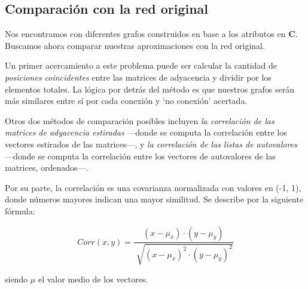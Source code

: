 
\vspace{2em}
\subsection{Comparación con la red original}


Nos encontramos con diferentes grafos construidos en base a los atributos en \textbf{C}. Buscamos ahora comparar nuestras aproximaciones con la red original. 

\vspace{1em}
Un primer acercamiento a este problema puede ser calcular la cantidad de \textit{posiciones coincidentes} entre las matrices de adyacencia y dividir por los elementos totales. La lógica por detrás del método es que nuestros grafos serán más similares entre sí por cada conexión y `no conexión' acertada. %

Otros dos métodos de comparación posibles incluyen \textit{la correlación de las matrices de adyacencia estiradas} ---donde se computa la correlación entre los vectores estirados de las matrices---, y \textit{la correlación de las listas de autovalores} ---donde se computa la correlación entre los vectores de autovalores de las matrices, ordenados---. 

Por su parte, la correlación es una covarianza normalizada con valores en (-1, 1), donde números mayores indican una mayor similitud. Se describe por la siguiente fórmula:

\vspace{1em}
\begin{equation}
    Corr(x, y) = \frac{(x - \mu_{x}) \cdot (y - \mu_{y})}{\sqrt[]{(x - \mu_{x})^{2} \cdot (y - \mu_{y})^{2}}}
    \label{eq:corr}
\end{equation}

\vspace{1em}
\noindent siendo $\mu$ el valor medio de los vectores.

